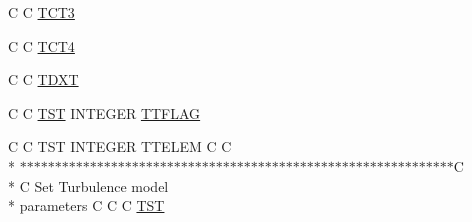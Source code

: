 \begin{DoxyCompactItemize}
C C \hyperlink{msa20_2home_2abonfi_2_c_f_d__codes_2_eul_f_s_83_82_83_2include_2turb_8com_a7018ba2eaa3b6ebcf121e8d87ea8190c}{T\-C\-T3}
\item 
C C \hyperlink{msa20_2home_2abonfi_2_c_f_d__codes_2_eul_f_s_83_82_83_2include_2turb_8com_a1f51e8ca66b410b1ce1046689d2e332f}{T\-C\-T4}
\item 
C C \hyperlink{msa20_2home_2abonfi_2_c_f_d__codes_2_eul_f_s_83_82_83_2include_2turb_8com_af243bf8446092716e2b3ec512084875a}{T\-D\-X\-T}
\item 
C C \hyperlink{msa20_2home_2abonfi_2_c_f_d__codes_2_eul_f_s_83_82_83_2include_2turb_8com_a677fc6bb107acfd381357f761464b300}{T\-S\-T} I\-N\-T\-E\-G\-E\-R \hyperlink{msa20_2home_2abonfi_2_c_f_d__codes_2_eul_f_s_83_82_83_2include_2turb_8com_a87765c4dc74ea7c718a022e09097d966}{T\-T\-F\-L\-A\-G}
\item 
C C T\-S\-T I\-N\-T\-E\-G\-E\-R T\-T\-E\-L\-E\-M C C \\*
$\ast$$\ast$$\ast$$\ast$$\ast$$\ast$$\ast$$\ast$$\ast$$\ast$$\ast$$\ast$$\ast$$\ast$$\ast$$\ast$$\ast$$\ast$$\ast$$\ast$$\ast$$\ast$$\ast$$\ast$$\ast$$\ast$$\ast$$\ast$$\ast$$\ast$$\ast$$\ast$$\ast$$\ast$$\ast$$\ast$$\ast$$\ast$$\ast$$\ast$$\ast$$\ast$$\ast$$\ast$$\ast$$\ast$$\ast$$\ast$$\ast$$\ast$$\ast$$\ast$$\ast$$\ast$$\ast$$\ast$$\ast$$\ast$$\ast$$\ast$$\ast$$\ast$C \\*
C Set Turbulence model \\*
parameters C C C \hyperlink{msa20_2home_2abonfi_2_c_f_d__codes_2_eul_f_s_83_82_83_2include_2turb_8com_a677fc6bb107acfd381357f761464b300}{T\-S\-T}
\end{DoxyCompactItemize}


